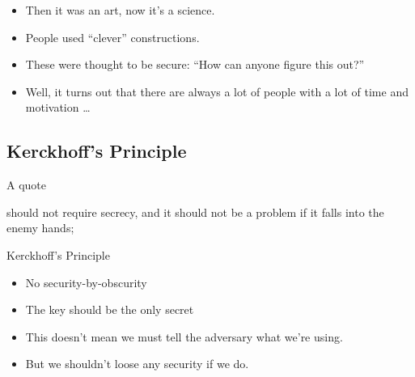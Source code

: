 \begin{frame}
  \begin{itemize}
    \item Then it was an art, now it's a science.

      \pause{}

    \item People used \enquote{clever} constructions.
    \item These were thought to be secure: \enquote{How can anyone figure this 
        out?}

      \pause{}

    \item Well, it turns out that there are always a lot of people with a lot 
      of time and motivation \dots
  \end{itemize}
\end{frame}

\subsection{Kerckhoff's Principle}

\begin{frame}
  \begin{block}{A quote}
    \begin{displayquote}\relax
      [A cryptosystem] should not require secrecy, and it should not be 
      a problem
      if it falls into the enemy hands;
    \end{displayquote}
  \end{block}

  \pause{}

  \begin{block}{Kerckhoff's Principle}
    \begin{itemize}
      \item No security-by-obscurity
      \item The key should be the only secret
    \end{itemize}
  \end{block}
\end{frame}

\begin{frame}
  \begin{remark}
    \begin{itemize}
      \item This doesn't mean we must tell the adversary what we're using.
      \item But we shouldn't loose any security if we do.
    \end{itemize}
  \end{remark}
\end{frame}



